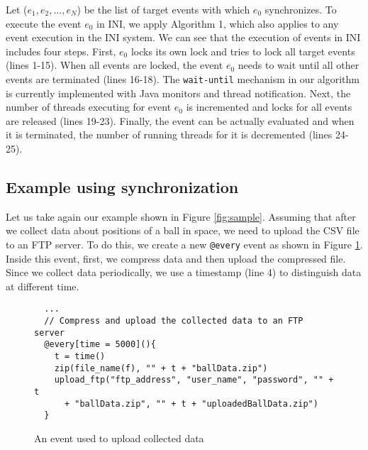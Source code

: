 \documentclass[runningheads,a4paper]{llncs}
\begin{document}
Let (\begin{math} e_{1}, e_{2}, ..., e_{N} \end{math}) be the list of target events with which \begin{math} e_0 \end{math} synchronizes. To execute the event \begin{math} e_0 \end{math} in INI, we apply Algorithm 1, which also applies to any event execution in the INI system. We can see that the execution of events in INI includes four steps. First, \begin{math} e_0 \end{math} locks its own lock and tries to lock all target events (lines 1-15). When all events are locked, the event \begin{math} e_0 \end{math} needs to wait until all other events are terminated (lines 16-18). The \texttt{wait-until} mechanism in our algorithm is currently implemented with Java monitors and thread notification. Next, the number of threads executing for event \begin{math} e_0 \end{math} is incremented and locks for all events are released (lines 19-23). Finally, the event can be actually evaluated and when it is terminated, the number of running threads for it is decremented (lines 24-25).

\subsection{Example using synchronization}

Let us take again our example shown in Figure \ref{fig:sample}. Assuming that after we collect data about positions of a ball in space, we need to upload the CSV file to an FTP server. To do this, we create a new \texttt{@every} event as shown in Figure \ref{fig:upload}. Inside this event, first, we compress data and then upload the compressed file. Since we collect data periodically, we use a timestamp (line 4) to distinguish data at different time.
\begin{figure}[h]
\begin{lstlisting}
  ...
  // Compress and upload the collected data to an FTP server
  @every[time = 5000](){
    t = time()
    zip(file_name(f), "" + t + "ballData.zip")
    upload_ftp("ftp_address", "user_name", "password", "" + t
      + "ballData.zip", "" + t + "uploadedBallData.zip")
  }
\end{lstlisting}
\centering
  \caption{An event used to upload collected data}
  \label{fig:upload}
\end{figure}
\end{document}
